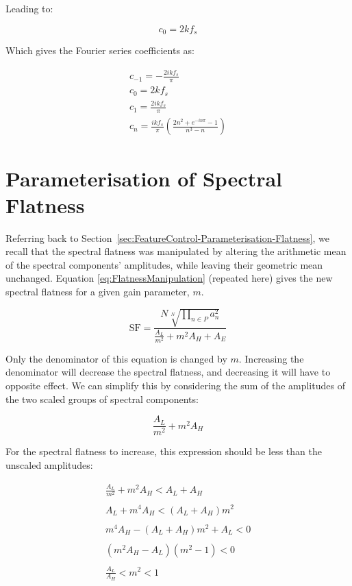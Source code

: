 \begin{appendices}
		Leading to:

		\[ c_{0} = 2kf_{s} \]

		Which gives the Fourier series coefficients as:

		\begin{gather}
			c_{-1} = - \frac{2ikf_{s}}{\pi} \nonumber \\
			c_{0} = 2kf_{s} \nonumber \\
			c_{1} = \frac{2ikf_{s}}{\pi} \nonumber \\
			c_{n} = \frac{ikf_{s}}{\pi} \left( \frac{2n^{2} + e^{-in\pi} - 1}{n^{3} - n} \right) \nonumber
		\end{gather}

	\section{Parameterisation of Spectral Flatness}
	\label{app:MathematicalDerivations-SpectralFlatness}
		Referring back to Section~\ref{sec:FeatureControl-Parameterisation-Flatness}, we recall that the spectral
		flatness was manipulated by altering the arithmetic mean of the spectral components' amplitudes, while
		leaving their geometric mean unchanged.	Equation \ref{eq:FlatnessManipulation} (repeated here) gives the new
		spectral flatness for a given gain parameter, $m$.

		\[ \mathrm{SF} = \frac{N\sqrt[N]{\prod_{n \in P} a_{n}^{2}}}
					   {\frac{A_{L}}{m^{2}} + m^{2}A_{H} + A_{E}} \]

		Only the denominator of this equation is changed by $m$. Increasing the denominator will decrease the
		spectral flatness, and decreasing it will have to opposite effect. We can simplify this by considering the
		sum of the amplitudes of the two scaled groups of spectral components:

		\[ \frac{A_{L}}{m^{2}} + m^{2}A_{H} \]

		For the spectral flatness to increase, this expression should be less than the unscaled amplitudes:

		\begin{gather}
			\frac{A_{L}}{m^{2}} + m^{2}A_{H} < A_{L} + A_{H} \nonumber \\
			\nonumber \\
			A_{L} + m^{4}A_{H} < (A_{L} + A_{H})m^{2} \nonumber \\
			\nonumber \\
			m^{4}A_{H} - (A_{L} + A_{H})m^{2} + A_{L} < 0 \nonumber \\
			\nonumber \\
			(m^{2}A_{H} - A_{L})(m^{2} - 1) < 0 \nonumber \\
			\nonumber \\
			\frac{A_{L}}{A_{H}} < m^{2} < 1 \nonumber
		\end{gather}


\end{appendices}

